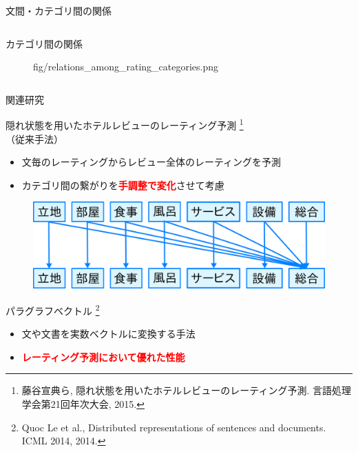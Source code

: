 \documentclass[aspectratio=43,unicode,10pt]{beamer}
\newcommand{\fire}[1]{\textcolor{red}{\textbf{#1}}}
\begin{document}
\begin{frame}{文間・カテゴリ間の関係}{}
\begin{columns}[t]
\begin{column}{0.4\textwidth}
\begin{block}{カテゴリ間の関係}
\begin{figure}
                          {fig/relations_among_rating_categories.png}
        \end{figure}
      \end{block}
    \end{column}
  \end{columns}
\end{frame}

\begin{frame}{関連研究}{}
  \begin{block}{隠れ状態を用いたホテルレビューのレーティング予測
                \footnote[frame]{
    藤谷宣典ら,
    隠れ状態を用いたホテルレビューのレーティング予測.
    言語処理学会第21回年次大会, 2015.
  }\\（従来手法）}
    \begin{itemize}
      \item 文毎のレーティングからレビュー全体のレーティングを予測
      \item カテゴリ間の繋がりを\fire{手調整で変化}させて考慮
    \end{itemize}
    \begin{figure}
      \vspace{-1em} %
      \includegraphics[width=0.5\linewidth]
                      {fig/fujitani_miml_relations_among_categories.png}
      \vspace{-1em} %
    \end{figure}
  \end{block}
  \begin{block}{パラグラフベクトル
                \footnote[frame]{
    Quoc Le et al.,
    Distributed representations of sentences and documents.
    ICML 2014, 2014.
  }}
    \begin{itemize}
      \item 文や文書を実数ベクトルに変換する手法
      \item \fire{レーティング予測において優れた性能}
    \end{itemize}
  \end{block}
\end{frame}
\end{document}
